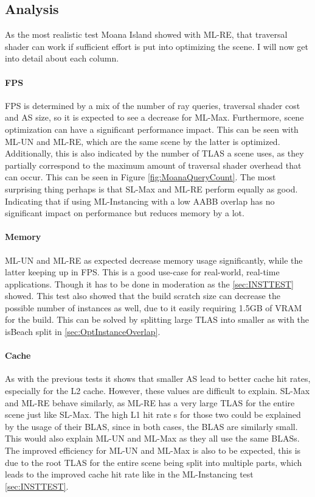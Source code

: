 \subsection{Analysis}
As the most realistic test Moana Island showed with ML-RE, that traversal shader can work if sufficient effort is put into optimizing the scene. I will now get into detail about each column.
\paragraph{FPS}
FPS is determined by a mix of the number of ray queries, traversal shader cost and AS size, so it is expected to see a decrease for ML-Max. Furthermore, scene optimization can have a significant performance impact. This can be seen with ML-UN and ML-RE, which are the same scene by the latter is optimized. Additionally, this is also indicated by the number of TLAS a scene uses, as they partially correspond to the maximum amount of traversal shader overhead that can occur. This can be seen in Figure \ref{fig:MoanaQueryCount}. The most surprising thing perhaps is that SL-Max and ML-RE perform equally as good. Indicating that if using ML-Instancing with a low AABB overlap has no significant impact on performance but reduces memory by a lot.
\paragraph{Memory}
ML-UN and ML-RE as expected decrease memory usage significantly, while the latter keeping up in FPS. This is a good use-case for real-world, real-time applications. Though it has to be done in moderation as the \ref{sec:INSTTEST} showed. This test also showed that the build scratch size can decrease the possible number of instances as well, due to it easily requiring 1.5GB of VRAM for the build. This can be solved by splitting large TLAS into smaller as with the isBeach split in \ref{sec:OptInstanceOverlap}.
\paragraph{Cache}
As with the previous tests it shows that smaller AS lead to better cache hit rates, especially for the L2 cache. However, these values are difficult to explain. SL-Max and ML-RE behave similarly, as ML-RE has a very large TLAS for the entire scene just like SL-Max. The high L1 hit rate    s for those two could be explained by the usage of their BLAS, since in both cases, the BLAS are similarly small. This would also explain ML-UN and ML-Max as they all use the same BLASs. The improved efficiency for ML-UN and ML-Max is also to be expected, this is due to the root TLAS for the entire scene being split into multiple parts, which leads to the improved cache hit rate like in the ML-Instancing test \ref{sec:INSTTEST}.
